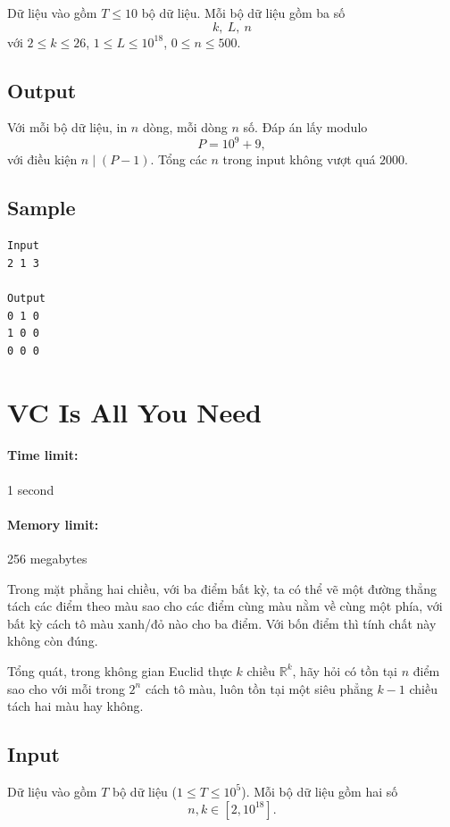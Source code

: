 \documentclass[11pt]{article}
\begin{document}
Dữ liệu vào gồm \(T\le 10\) bộ dữ liệu. Mỗi bộ dữ liệu gồm ba số
\[
  k,\ L,\ n
\]
với \(2\le k\le 26\), \(1\le L\le 10^{18}\), \(0\le n\le 500\).

\subsection*{Output}

Với mỗi bộ dữ liệu, in \(n\) dòng, mỗi dòng \(n\) số. Đáp án lấy modulo
\[
  P=10^9+9,
\]
với điều kiện \(n\mid(P-1)\). Tổng các \(n\) trong input không vượt quá
\(2000\).

\subsection*{Sample}

\begin{verbatim}
Input
2 1 3

Output
0 1 0
1 0 0
0 0 0
\end{verbatim}

\section{VC Is All You Need}

\paragraph{Time limit:} 1 second
\paragraph{Memory limit:} 256 megabytes

Trong mặt phẳng hai chiều, với ba điểm bất kỳ, ta có thể vẽ một đường thẳng
tách các điểm theo màu sao cho các điểm cùng màu nằm về cùng một phía, với
bất kỳ cách tô màu xanh/đỏ nào cho ba điểm. Với bốn điểm thì tính chất này
không còn đúng.

Tổng quát, trong không gian Euclid thực \(k\) chiều \(\mathbb{R}^k\), hãy hỏi
có tồn tại \(n\) điểm sao cho với mỗi trong \(2^n\) cách tô màu, luôn tồn tại
một siêu phẳng \(k-1\) chiều tách hai màu hay không.

\subsection*{Input}

Dữ liệu vào gồm \(T\) bộ dữ liệu (\(1\le T\le 10^5\)). Mỗi bộ dữ liệu gồm hai số
\[
  n,k\in[2,10^{18}].
\]
\end{document}
